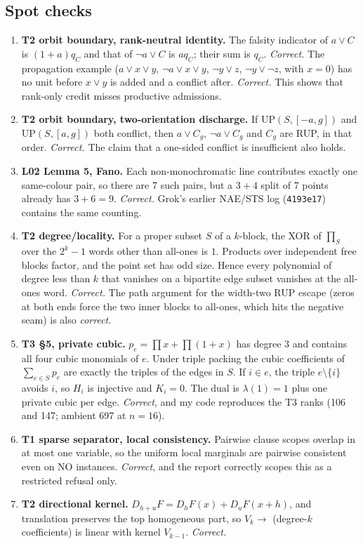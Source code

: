\documentclass[11pt]{article}
\theoremstyle{remark}
\begin{document}
\subsection{Spot checks}\label{sec:spot}
\begin{enumerate}
\item \textbf{T2 orbit boundary, rank-neutral identity.} The falsity indicator of $a\lor C$
is $(1+a)q_C$ and that of $\lnot a\lor C$ is $aq_C$; their sum is $q_C$. \emph{Correct.} The
propagation example ($a\lor x\lor y$, $\lnot a\lor x\lor y$, $\lnot y\lor z$,
$\lnot y\lor\lnot z$, with $x=0$) has no unit before $x\lor y$ is added and a conflict after.
\emph{Correct.} This shows that rank-only credit misses productive admissions.
\item \textbf{T2 orbit boundary, two-orientation discharge.} If $\mathrm{UP}(S,[-a,g])$ and
$\mathrm{UP}(S,[a,g])$ both conflict, then $a\lor C_g$, $\lnot a\lor C_g$ and $C_g$ are RUP,
in that order. \emph{Correct.} The claim that a one-sided conflict is insufficient also holds.
\item \textbf{L02 Lemma 5, Fano.} Each non-monochromatic line contributes exactly one
same-colour pair, so there are 7 such pairs, but a $3{+}4$ split of 7 points already has
$3+6=9$. \emph{Correct.} Grok's earlier NAE/STS log (\texttt{4193e17}) contains the same
counting.
\item \textbf{T2 degree/locality.} For a proper subset $S$ of a $k$-block, the XOR of
$\prod_S$ over the $2^k-1$ words other than all-ones is $1$. Products over independent free
blocks factor, and the point set has odd size. Hence every polynomial of degree less than
$k$ that vanishes on a bipartite edge subset vanishes at the all-ones word. \emph{Correct.}
The path argument for the width-two RUP escape (zeros at both ends force the two inner blocks
to all-ones, which hits the negative seam) is also \emph{correct}.
\item \textbf{T3 \S5, private cubic.} $p_e=\prod x+\prod(1+x)$ has degree 3 and contains all
four cubic monomials of $e$. Under triple packing the cubic coefficients of $\sum_{e\in S}p_e$
are exactly the triples of the edges in $S$. If $i\in e$, the triple $e\setminus\{i\}$ avoids
$i$, so $H_i$ is injective and $K_i=0$. The dual is $\lambda(1)=1$ plus one private cubic per
edge. \emph{Correct}, and my code reproduces the T3 ranks (106 and 147; ambient 697 at
$n=16$).
\item \textbf{T1 sparse separator, local consistency.} Pairwise clause scopes overlap in at
most one variable, so the uniform local marginals are pairwise consistent even on NO
instances. \emph{Correct}, and the report correctly scopes this as a restricted refusal only.
\item \textbf{T2 directional kernel.} $D_{h+u}F=D_hF(x)+D_uF(x+h)$, and translation preserves
the top homogeneous part, so $V_k\to$ (degree-$k$ coefficients) is linear with kernel
$V_{k-1}$. \emph{Correct.}
\end{enumerate}
\end{document}
